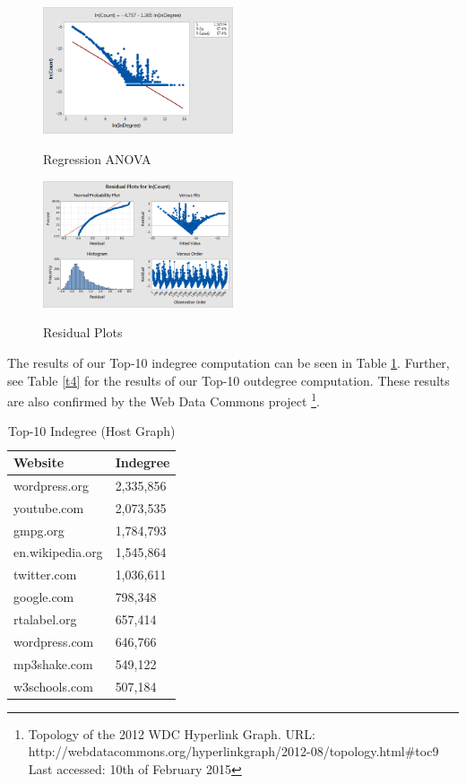 \begin{figure}[h]
	\begin{center}
		\label{fig14}		
		\includegraphics[width=0.5\textwidth]{fig14}	
		\caption{Regression ANOVA}	
	\end{center}
\end{figure}

\begin{figure}[h]
	\begin{center}
		\label{fig15}		
		\includegraphics[width=0.5\textwidth]{fig15}	
		\caption{Residual Plots}	
	\end{center}
\end{figure}

The results of our Top-10 indegree computation can be seen in Table \ref{t4a}. Further, see Table \ref{t4} for the results of our Top-10 outdegree computation. These results are also confirmed by the Web Data Commons project \footnote{Topology of the 2012 WDC Hyperlink Graph. URL: http://webdatacommons.org/hyperlinkgraph/2012-08/topology.html\#toc9 Last accessed: 10th of February 2015}.

\begin{table}[t]
	\caption{Top-10 Indegree (Host Graph)}
	\label{t4a}
	\begin{center}
		\begin{tabular}{|l|l|}
			\hline
			Website	&Indegree \\ \hline
			wordpress.org	&2,335,856 \\ \hline
			youtube.com	&2,073,535 \\ \hline
			gmpg.org	&1,784,793 \\ \hline
			en.wikipedia.org	&1,545,864 \\ \hline
			twitter.com	&1,036,611 \\ \hline
			google.com	&798,348 \\ \hline
			rtalabel.org	&657,414 \\ \hline
			wordpress.com	&646,766 \\ \hline
			mp3shake.com	&549,122 \\ \hline
			w3schools.com	&507,184 \\ \hline
		\end{tabular}
	\end{center}
\end{table}

